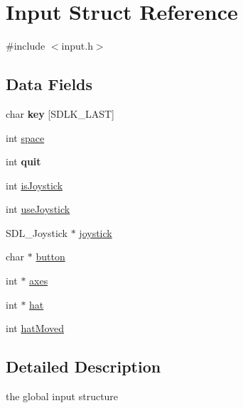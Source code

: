 \hypertarget{struct_input}{\section{Input Struct Reference}
\label{struct_input}
}


{\ttfamily \#include $<$input.\-h$>$}

\subsection*{Data Fields}
\begin{DoxyCompactItemize}
\item 
\hypertarget{struct_input_afc4eabd057bd0061b56de4005f5ecbb8}{char {\bfseries key} \mbox{[}S\-D\-L\-K\-\_\-\-L\-A\-S\-T\mbox{]}}\label{struct_input_afc4eabd057bd0061b56de4005f5ecbb8}

\item 
int \hyperlink{struct_input_ab05991ed532329184893692211b355fa}{space}
\item 
\hypertarget{struct_input_a2896431d6a80cd39b3d24b40237612ee}{int {\bfseries quit}}\label{struct_input_a2896431d6a80cd39b3d24b40237612ee}

\item 
int \hyperlink{struct_input_a163e08d0d19093f658f448710f8e3c49}{is\-Joystick}
\item 
int \hyperlink{struct_input_a66b84ad51037935b993fc2b860b15cb6}{use\-Joystick}
\item 
S\-D\-L\-\_\-\-Joystick $\ast$ \hyperlink{struct_input_a5fe6c6b426f70a21df07c64227b2c337}{joystick}
\item 
char $\ast$ \hyperlink{struct_input_a7f901d4dc1179ea534cb9e5cce0a260b}{button}
\item 
int $\ast$ \hyperlink{struct_input_ae2fe71f7c5edeaa9fc2676be4a93499a}{axes}
\item 
int $\ast$ \hyperlink{struct_input_ab1c8c264ad7cfee584093b1479c03f75}{hat}
\item 
int \hyperlink{struct_input_af7cf3c53ae2105eec18ce989dd3ddae0}{hat\-Moved}
\end{DoxyCompactItemize}


\subsection{Detailed Description}
the global input structure 

